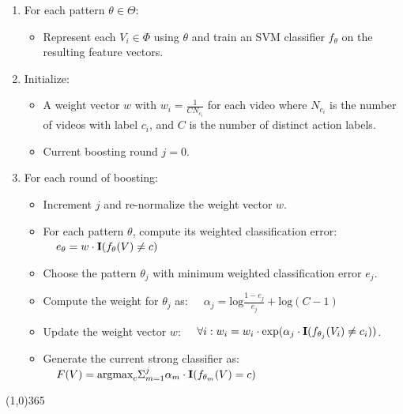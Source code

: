 \documentclass{bmvc2k}
\begin{document}
			\begin{enumerate}
				\item For each pattern $\theta \in \Theta$:
					\begin{itemize}
            \item Represent each $V_i \in \Phi$ using $\theta$
						and train an SVM classifier $f_\theta$ on the
            resulting feature vectors.
					\end{itemize}

				\item Initialize:
					\begin{itemize}
						\item A weight vector $w$ with $w_i = \frac{1}{C N_{c_i}}$ for each video
              where 
				      $N_{c_i}$ is the number of videos with label $c_i$, and
              $C$ is the number of distinct action labels.
						\item Current boosting round $j=0$.
					\end{itemize}

				\item For each round of boosting:
					\begin{itemize}
						\item Increment $j$ and re-normalize the weight vector $w$.
					  \item For each pattern $\theta$,
              compute its weighted classification error:
              $\;\;\;\;e_\theta = w \cdot \mbox{\textbf{I}}(f_\theta(V) \neq c)$
						\item Choose the pattern $\theta_j$ with minimum weighted
              classification error $e_j$.
						\item Compute the weight for $\theta_j$ as:
              $\;\;\;\;\alpha_j = \mbox{log} \frac{1 - e_j}{e_j} + \mbox{log}(C-1)$
						\item Update the weight vector $w$:
							$\;\;\;\;\forall i: w_i = w_i \cdot \mbox{exp}(\alpha_j \cdot
							\mbox{\textbf{I}}(f_{\theta_j}(V_i) \neq c_i))$.
						\item Generate the current strong classifier as:
							$\;\;\;\;F(V) = \mbox{argmax}_c \Sigma_{m=1}^j \alpha_m \cdot
							\mbox{\textbf{I}}(f_{\theta_m}(V) = c)$
					\end{itemize}
			\end{enumerate}
  \line(1,0){365}\\
  \normalsize
  
\end{document}
